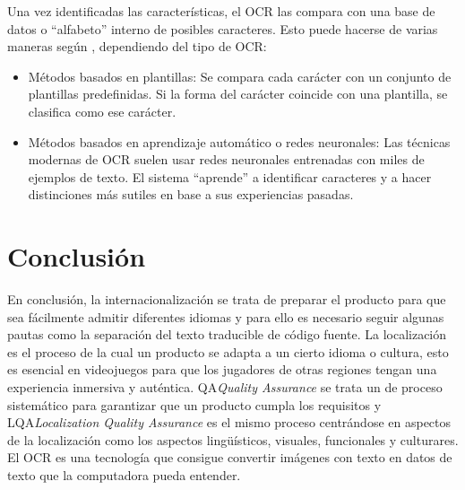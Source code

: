 \begin{enumerate}
	Una vez identificadas las características, el OCR las compara con una base de datos o ``alfabeto'' interno de posibles caracteres. Esto puede hacerse de varias maneras según \cite{WhatIsOCR}, dependiendo del tipo de OCR:
	\begin{itemize}
		\item Métodos basados en plantillas: Se compara cada carácter con un conjunto de plantillas predefinidas. Si la forma del carácter coincide con una plantilla, se clasifica como ese carácter.
		\item Métodos basados en aprendizaje automático o redes neuronales: Las técnicas modernas de OCR suelen usar redes neuronales entrenadas con miles de ejemplos de texto. El sistema ``aprende'' a identificar caracteres y a hacer distinciones más sutiles en base a sus experiencias pasadas.
	\end{itemize}

	
	
\end{enumerate}
\section{Conclusión}
En conclusión, la internacionalización se trata de preparar el producto para que sea fácilmente admitir diferentes idiomas y para ello es necesario seguir algunas pautas como la separación del texto traducible de código fuente. La localización es el proceso de la cual un producto se adapta a un cierto idioma o cultura, esto es esencial en videojuegos para que los jugadores de otras regiones tengan una experiencia inmersiva y auténtica. QA\textit{Quality Assurance} se trata un de proceso sistemático para garantizar que un producto cumpla los requisitos y LQA\textit{Localization Quality Assurance} es el mismo proceso centrándose en aspectos de la localización como los aspectos lingüísticos, visuales, funcionales y culturares. El OCR es una tecnología que consigue convertir imágenes con texto en datos de texto que la computadora pueda entender.
